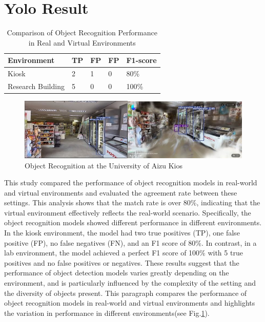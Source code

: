 \section{Yolo Result}
\label{sec:YoloResult}

\begin{table}[htbp]
    \caption{Comparison of Object Recognition Performance in Real and Virtual Environments}
    \centering
    \begin{tabularx}{\textwidth}{|X|X|X|X|X|}
        \hline
        Environment & TP & FP & FP & F1-score \\
        \hline
        Kiosk & 2 & 1 & 0 & 80\% \\
        \hline
        Research Building & 5 & 0 & 0 & 100\% \\
        \hline
    \end{tabularx}
    \label{tab:ComparisonofObjectRecognitionPerformanceinRealandVirtualEnvironments}
\end{table}
\begin{figure}[htbp]
  \centering
  \includegraphics[scale=0.5]{./Figure/Object Recognition at the University of Aizu Kios}
  \caption{Object Recognition at the University of Aizu Kios}
  \label{fig: Object Recognition at the University of Aizu Kios}
\end{figure}
This study compared the performance of object recognition models in real-world and virtual environments and evaluated the agreement rate between these settings. This analysis shows that the match rate is over 80\%, indicating that the virtual environment effectively reflects the real-world scenario. Specifically, the object recognition models showed different performance in different environments. In the kiosk environment, the model had two true positives (TP), one false positive (FP), no false negatives (FN), and an F1 score of 80\%. In contrast, in a lab environment, the model achieved a perfect F1 score of 100\% with 5 true positives and no false positives or negatives. These results suggest that the performance of object detection models varies greatly depending on the environment, and is particularly influenced by the complexity of the setting and the diversity of objects present. This paragraph compares the performance of object recognition models in real-world and virtual environments and highlights the variation in performance in different environments(see Fig.\ref{fig: Object Recognition at the University of Aizu Kios}).

